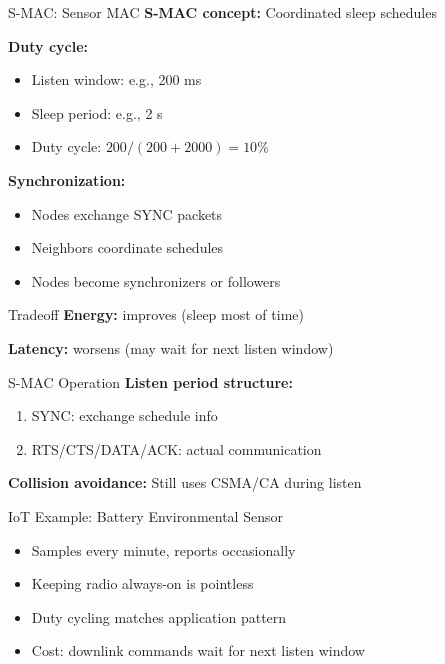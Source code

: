 \documentclass[aspectratio=169,11pt]{beamer}
\begin{document}
\begin{frame}{S-MAC: Sensor MAC}
    \textbf{S-MAC concept:} Coordinated sleep schedules
    
    \vspace{0.3cm}
    \textbf{Duty cycle:}
    \begin{itemize}
        \item Listen window: e.g., 200 ms
        \item Sleep period: e.g., 2 s
        \item Duty cycle: $200/(200+2000) = 10\%$
    \end{itemize}
    
    \vspace{0.2cm}
    \textbf{Synchronization:}
    \begin{itemize}
        \item Nodes exchange SYNC packets
        \item Neighbors coordinate schedules
        \item Nodes become synchronizers or followers
    \end{itemize}
    
    \begin{block}{Tradeoff}
        \textbf{Energy:} improves (sleep most of time)
        
        \textbf{Latency:} worsens (may wait for next listen window)
    \end{block}
\end{frame}

\begin{frame}{S-MAC Operation}
    \textbf{Listen period structure:}
    \begin{enumerate}
        \item SYNC: exchange schedule info
        \item RTS/CTS/DATA/ACK: actual communication
    \end{enumerate}
    
    \vspace{0.3cm}
    \textbf{Collision avoidance:} Still uses CSMA/CA during listen
    
    \vspace{0.3cm}
    \begin{exampleblock}{IoT Example: Battery Environmental Sensor}
        \begin{itemize}
            \item Samples every minute, reports occasionally
            \item Keeping radio always-on is pointless
            \item Duty cycling matches application pattern
            \item Cost: downlink commands wait for next listen window
        \end{itemize}
    \end{exampleblock}
\end{frame}
\end{document}
